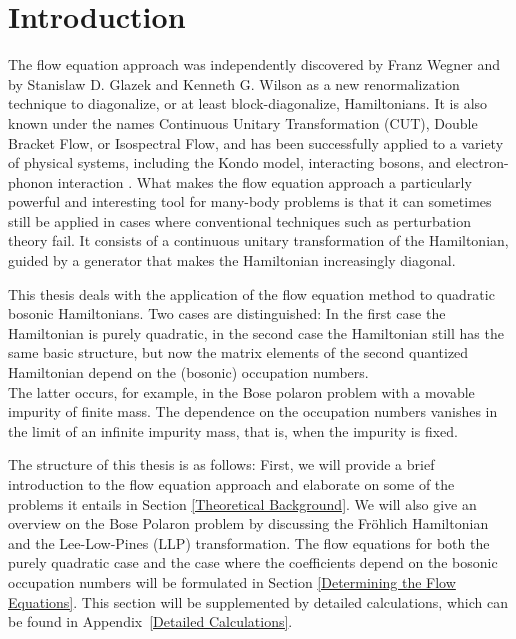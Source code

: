 \chapter{Introduction}
The flow equation approach was independently discovered by Franz Wegner \cite{https://doi.org/10.1002/andp.19945060203} and by Stanislaw D. Glazek and Kenneth G. Wilson \cite{PhysRevD.48.5863} as a new renormalization technique to diagonalize, or at least block-diagonalize, Hamiltonians. It is also known under the names Continuous Unitary Transformation (CUT), Double Bracket Flow, or Isospectral Flow, and has been successfully applied to a variety of physical systems, including the Kondo model, interacting bosons, and electron-phonon interaction \cite{Wegner_2006}. What makes the flow equation approach a particularly powerful and interesting tool for many-body problems is that it can sometimes still be applied in cases where conventional techniques such as perturbation theory fail. It consists of a continuous unitary transformation of the Hamiltonian, guided by a generator that makes the Hamiltonian increasingly diagonal. \par
This thesis deals with the application of the flow equation method to quadratic bosonic Hamiltonians. Two cases are distinguished: In the first case the Hamiltonian is purely quadratic, in the second case the Hamiltonian still has the same basic structure, but now the matrix elements of the second quantized Hamiltonian depend on the (bosonic) occupation numbers.\\
The latter occurs, for example, in the Bose polaron problem with a movable impurity of finite mass. The dependence on the occupation numbers vanishes in the limit of an infinite impurity mass, that is, when the impurity is fixed.\par
The structure of this thesis is as follows: First, we will provide a brief introduction to the flow equation approach and elaborate on some of the problems it entails in Section \ref{Theoretical Background}. We will also give an overview on the Bose Polaron problem by discussing the Fröhlich Hamiltonian and the Lee-Low-Pines (LLP) transformation. The flow equations for both the purely quadratic case and the case where the coefficients depend on the bosonic occupation numbers will be formulated in Section \ref{Determining the Flow Equations}. This section will be supplemented by detailed calculations, which can be found in \mbox{Appendix \ref{Detailed Calculations}}.\\
